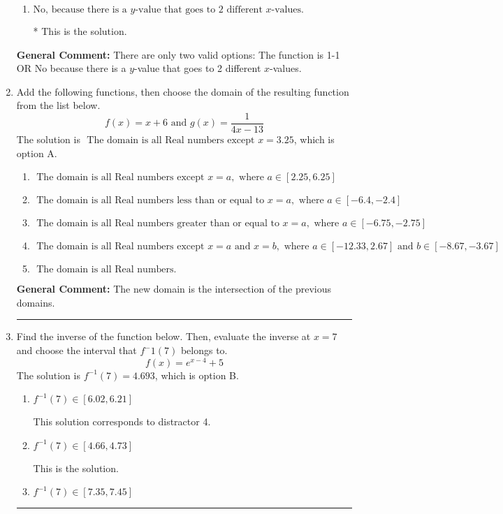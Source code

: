 \documentclass{extbook}[14pt]
\newcommand{\litem}[1]{\item #1

\rule{\textwidth}{0.4pt}}
\begin{document}
\begin{enumerate}
{\begin{enumerate}[label=\Alph*.]
Corresponds to believing the function passes the Horizontal Line test.
\item \( \text{No, because there is a $y$-value that goes to 2 different $x$-values.} \)

* This is the solution.
\end{enumerate}

\textbf{General Comment:} There are only two valid options: The function is 1-1 OR No because there is a $y$-value that goes to 2 different $x$-values.
}
\litem{
Add the following functions, then choose the domain of the resulting function from the list below.
\[ f(x) = x + 6 \text{ and } g(x) = \frac{1}{4x-13} \]The solution is \( \text{ The domain is all Real numbers except } x = 3.25 \), which is option A.\begin{enumerate}[label=\Alph*.]
\item \( \text{ The domain is all Real numbers except } x = a, \text{ where } a \in [2.25, 6.25] \)


\item \( \text{ The domain is all Real numbers less than or equal to } x = a, \text{ where } a \in [-6.4, -2.4] \)


\item \( \text{ The domain is all Real numbers greater than or equal to } x = a, \text{ where } a \in [-6.75, -2.75] \)


\item \( \text{ The domain is all Real numbers except } x = a \text{ and } x = b, \text{ where } a \in [-12.33, 2.67] \text{ and } b \in [-8.67, -3.67] \)


\item \( \text{ The domain is all Real numbers. } \)


\end{enumerate}

\textbf{General Comment:} The new domain is the intersection of the previous domains.
}
\litem{
Find the inverse of the function below. Then, evaluate the inverse at $x = 7$ and choose the interval that $f^-1(7)$ belongs to.
\[ f(x) = e^{x-4}+5 \]The solution is \( f^{-1}(7) = 4.693 \), which is option B.\begin{enumerate}[label=\Alph*.]
\item \( f^{-1}(7) \in [6.02, 6.21] \)

 This solution corresponds to distractor 4.
\item \( f^{-1}(7) \in [4.66, 4.73] \)

 This is the solution.
\item \( f^{-1}(7) \in [7.35, 7.45] \)


\end{enumerate}}
\end{enumerate}
\end{document}
